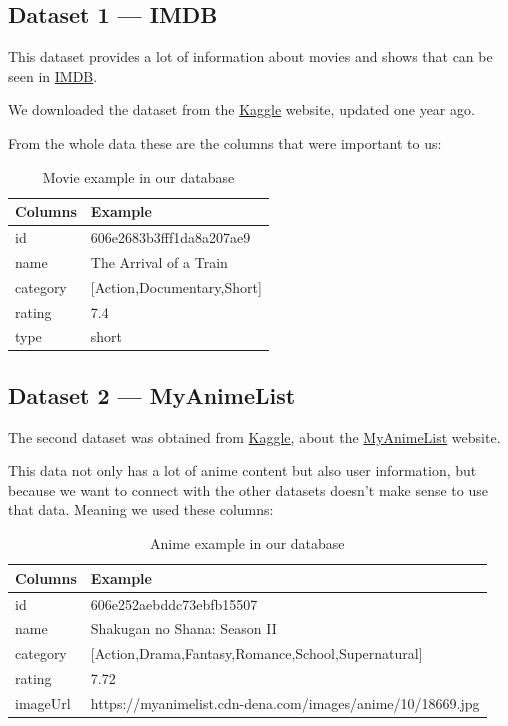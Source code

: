 \documentclass{article}
\newcommand*\fpar{\hspace{1ex}}
\begin{document}
  \subsection{Dataset 1 — IMDB}
  \label{sec:movies}
  \fpar This dataset provides a lot of information about movies and shows that can be seen in \href{https://www.imdb.com}{IMDB}.
  \par We downloaded the dataset from the \href{https://www.kaggle.com/ashirwadsangwan/imdb-dataset}{Kaggle} website, updated one year ago.
  \par From the whole data these are the columns that were important to us:
  \begin{table}[H]
    \centering
    \begin{tabular}{l|l}
      Columns & Example                     \\ \hline
      id      & 606e2683b3fff1da8a207ae9    \\
      name    & The Arrival of a Train      \\
      category& [Action,Documentary,Short]  \\
      rating  & 7.4                         \\
      type    & short
    \end{tabular}
    \caption{Movie example in our database}
    \label{table:movie}
  \end{table}

  \subsection{Dataset 2 — MyAnimeList}
  \label{sec:animes}
  \fpar The second dataset was obtained from \href{https://www.kaggle.com/azathoth42/myanimelist}{Kaggle}, about the \href{https://myanimelist.net/}{MyAnimeList} website.
  \par This data not only has a lot of anime content but also user information, but because we want to connect with the other datasets doesn't make sense to use that data. Meaning we used these columns:
  \begin{table}[H]
    \centering
    \begin{tabular}{l|l}
      Columns & Example                       \\ \hline
      id      & 606e252aebddc73ebfb15507      \\
      name    & Shakugan no Shana: Season II  \\
      category& [Action,Drama,Fantasy,Romance,School,Supernatural]  \\
      rating  & 7.72                          \\
      imageUrl& https://myanimelist.cdn-dena.com/images/anime/10/18669.jpg
    \end{tabular}
    \caption{Anime example in our database}
    \label{table:anime}
  \end{table}
\end{document}
